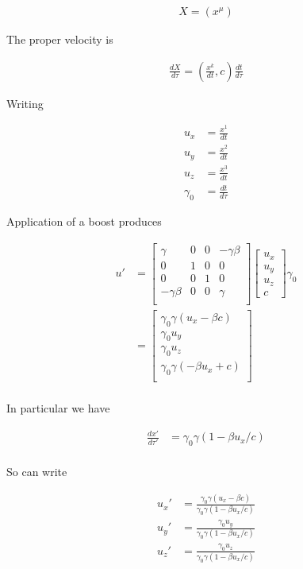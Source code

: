 \begin{align*}
X = (x^\mu)
\end{align*}

The proper velocity is

\begin{align*}
\frac{dX}{d\tau} = \left(\frac{x^k}{dt}, c \right) \frac{dt}{d\tau}
\end{align*}

Writing

\begin{align*}
u_x &= \frac{x^1}{dt} \\
u_y &= \frac{x^2}{dt} \\
u_z &= \frac{x^3}{dt} \\
\gamma_0 &= \frac{dt}{d\tau}
\end{align*}

Application of a boost produces

\begin{align*}
u'
&=
\begin{bmatrix}
\gamma & 0 & 0 & - \gamma \beta \\
0 & 1 & 0 & 0 \\
0 & 0 & 1 & 0 \\
- \gamma \beta & 0 & 0 & \gamma \\
\end{bmatrix}
\begin{bmatrix}
u_x \\
u_y \\
u_z \\
c
\end{bmatrix}
\gamma_0 \\
&=
\begin{bmatrix}
\gamma_0 \gamma (u_x - \beta c) \\
\gamma_0 u_y \\
\gamma_0 u_z \\
\gamma_0 \gamma ( -\beta u_x + c ) \\
\end{bmatrix} \\
\end{align*}

In particular we have

\begin{align*}
\frac{dx'}{d\tau'} &= \gamma_0 \gamma ( 1 -\beta u_x/c ) \\
\end{align*}

So can write

\begin{align*}
u_x' &=
\frac{\gamma_0 \gamma (u_x - \beta c) }
{\gamma_0 \gamma ( 1 -\beta u_x/c )} \\
u_y' &=
\frac{\gamma_0 u_y }
{\gamma_0 \gamma ( 1 -\beta u_x/c )} \\
u_z' &=
\frac{\gamma_0 u_z }
{\gamma_0 \gamma ( 1 -\beta u_x/c )} \\
\end{align*}

